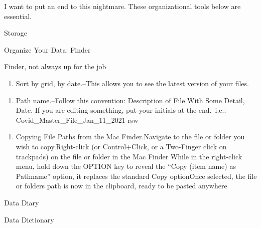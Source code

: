 \documentclass[]{book}
\providecommand{\tightlist}{%
  \setlength{\itemsep}{0pt}\setlength{\parskip}{0pt}}
\begin{document}
I want to put an end to this nightmare. These organizational tools below are essential.

Storage

Organize Your Data: Finder

Finder, not always up for the job

\begin{enumerate}
\def\labelenumi{\arabic{enumi}.}
\tightlist
\item
  Sort by grid, by date.--This allows you to see the latest version of your files.
\end{enumerate}

\begin{enumerate}
\def\labelenumi{\arabic{enumi}.}
\setcounter{enumi}{1}
\tightlist
\item
  Path name.--Follow this convention: Description of File With Some Detail, Date. If you are editing something, put your initials at the end.--i.e.: Covid\_Master\_File\_Jan\_11\_2021-rsw
\end{enumerate}

\begin{enumerate}
\def\labelenumi{\arabic{enumi}.}
\setcounter{enumi}{2}
\tightlist
\item
  Copying File Paths from the Mac Finder.Navigate to the file or folder you wish to copy.Right-click (or Control+Click, or a Two-Finger click on trackpads) on the file or folder in the Mac Finder While in the right-click menu, hold down the OPTION key to reveal the ``Copy (item name) as Pathname'' option, it replaces the standard Copy optionOnce selected, the file or folders path is now in the clipboard, ready to be pasted anywhere
\end{enumerate}

Data Diary

Data Dictionary
\end{document}
